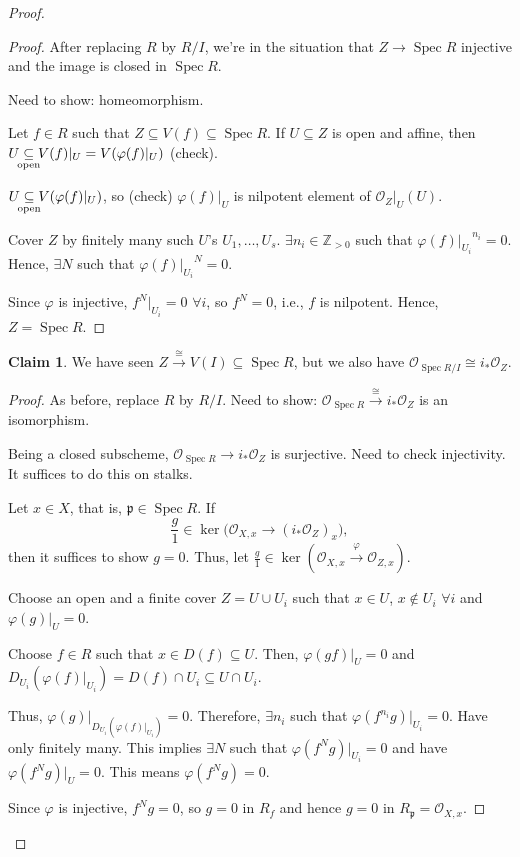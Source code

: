 \documentclass[12pt]{article}
\DeclareMathOperator{\Spec}{Spec}
\theoremstyle{definition}
\newtheorem{claim+}{Claim}
\theoremstyle{remark}
\begin{document}
\begin{proof}
\begin{proof}
After replacing $R$ by $R/I$, we're in the situation that $Z\rightarrow\Spec R$ injective and the image is closed in $\Spec R$.

Need to show: homeomorphism.

Let $f\in R$ such that $Z\subseteq V(f)\subseteq\Spec R$. If $U\subseteq Z$ is open and affine, then $U\underset{\mathclap{\text{open}}}{\subseteq}V(f)|_U=V(\varphi(f)|_U)$ (check).

$U\underset{\mathclap{\text{open}}}{\subseteq}V(\varphi(f)|_U)$, so (check) $\varphi(f)|_U$ is nilpotent element of $\mathcal{O}_Z|_U(U)$.

Cover $Z$ by finitely many such $U$'s $U_1,\ldots,U_s$. $\exists n_i\in\mathbb{Z}_{>0}$ such that ${\varphi(f)|_{U_i}}^{n_i}=0$. Hence, $\exists N$ such that ${\varphi(f)|_{U_i}}^N=0$.

Since $\varphi$ is injective, $f^N|_{U_i}=0$ $\forall i$, so $f^N=0$, i.e., $f$ is nilpotent. Hence, $Z=\Spec R$.
\end{proof}

\begin{claim+}
We have seen $Z\xrightarrow{\cong}V(I)\subseteq\Spec R$, but we also have $\mathcal{O}_{\Spec R/I}\cong i_*\mathcal{O}_Z$.
\end{claim+}

\begin{proof}
As before, replace $R$ by $R/I$. Need to show: $\mathcal{O}_{\Spec R}\xrightarrow{\cong}i_*\mathcal{O}_Z$ is an isomorphism.

Being a closed subscheme, $\mathcal{O}_{\Spec R}\rightarrow i_*\mathcal{O}_Z$ is surjective. Need to check injectivity. It suffices to do this on stalks.

Let $x\in X$, that is, $\mathfrak{p}\in\Spec R$. If
\[\frac{g}{1}\in\ker\big(\mathcal{O}_{X,x}\longrightarrow(i_*\mathcal{O}_Z)_x\big),\]
then it suffices to show $g=0$. Thus, let $\frac{g}{1}\in\ker(\mathcal{O}_{X,x}\xrightarrow{\varphi}\mathcal{O}_{Z,x})$.

Choose an open and a finite cover $Z=U\cup U_i$ such that $x\in U$, $x\notin U_i$ $\forall i$ and $\varphi(g)|_U=0$.

Choose $f\in R$ such that $x\in D(f)\subseteq U$. Then, $\varphi(gf)|_U=0$ and $D_{U_i}(\varphi(f)|_{U_i})=D(f)\cap U_i\subseteq U\cap U_i$.

Thus, $\varphi(g)|_{D_{U_i}(\varphi(f)|_{U_i})}=0$. Therefore, $\exists n_i$ such that $\varphi(f^{n_i}g)|_{U_i}=0$. Have only finitely many. This implies $\exists N$ such that $\varphi(f^Ng)|_{U_i}=0$ and have $\varphi(f^Ng)|_U=0$. This means $\varphi(f^Ng)=0$.

Since $\varphi$ is injective, $f^Ng=0$, so $g=0$ in $R_f$ and hence $g=0$ in $R_{\mathfrak{p}}=\mathcal{O}_{X,x}$.
\end{proof}
\end{proof}
\end{document}
